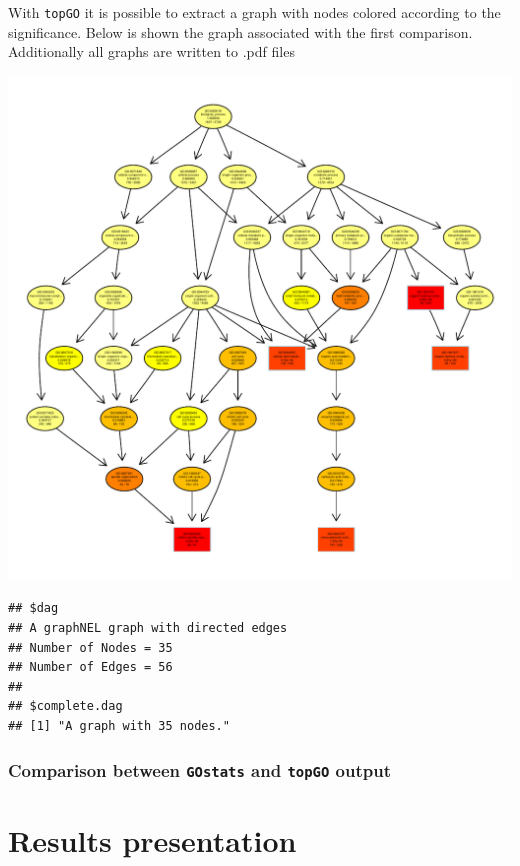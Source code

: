 \documentclass{article}\usepackage[]{graphicx}\usepackage[]{color}
\makeatletter
\def\maxwidth{ %
  \ifdim\Gin@nat@width>\linewidth
    \linewidth
  \else
    \Gin@nat@width
  \fi
}
\newenvironment{kframe}{%
 \def\at@end@of@kframe{}%
 \ifinner\ifhmode%
  \def\at@end@of@kframe{\end{minipage}}%
  \begin{minipage}{\columnwidth}%
 \fi\fi%
 \def\FrameCommand##1{\hskip\@totalleftmargin \hskip-\fboxsep
 \colorbox{shadecolor}{##1}\hskip-\fboxsep
     \hskip-\linewidth \hskip-\@totalleftmargin \hskip\columnwidth}%
 \MakeFramed {\advance\hsize-\width
   \@totalleftmargin\z@ \linewidth\hsize
   \@setminipage}}%
 {\par\unskip\endMakeFramed%
 \at@end@of@kframe}
\newenvironment{knitrout}{}{} %
\makeatother
\begin{document}
With \texttt{topGO} it is possible to extract a graph with nodes colored according to the significance. Below is shown the graph associated with the first comparison. Additionally all graphs are written to .pdf files

\begin{knitrout}
\color{fgcolor}
\includegraphics[width=\maxwidth]{images/graficGOgraphs-1} 
\begin{kframe}\begin{verbatim}
## $dag
## A graphNEL graph with directed edges
## Number of Nodes = 35 
## Number of Edges = 56 
## 
## $complete.dag
## [1] "A graph with 35 nodes."
\end{verbatim}
\end{kframe}
\end{knitrout}

\subsubsection{Comparison between \texttt{GOstats} and \texttt{topGO} output}

\section{Results presentation}
\end{document}

